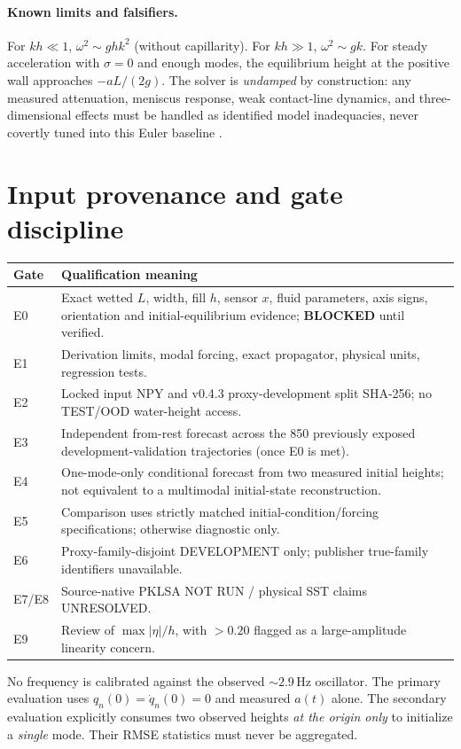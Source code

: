 \documentclass[11pt,a4paper]{article}
\begin{document}
\paragraph{Known limits and falsifiers.} For $kh\ll1$, $\omega^2\sim ghk^2$ (without capillarity). For $kh\gg1$, $\omega^2\sim gk$. For steady acceleration with $\sigma=0$ and enough modes, the equilibrium height at the positive wall approaches $-aL/(2g)$. The solver is \emph{undamped} by construction: any measured attenuation, meniscus response, weak contact-line dynamics, and three-dimensional effects must be handled as identified model inadequacies, never covertly tuned into this Euler baseline \cite{FaltinsenTimokha2009,FaltinsenEtAl2000}.

\section{Input provenance and gate discipline}
\begin{center}
\begin{tabular}{@{}lp{11.5cm}@{}}\toprule
Gate & Qualification meaning\\\midrule
E0 & Exact wetted $L$, width, fill $h$, sensor $x$, fluid parameters, axis signs, orientation and initial-equilibrium evidence; \textbf{BLOCKED} until verified.\\
E1 & Derivation limits, modal forcing, exact propagator, physical units, regression tests.\\
E2 & Locked input NPY and v0.4.3 proxy-development split SHA-256; no TEST/OOD water-height access.\\
E3 & Independent from-rest forecast across the 850 previously exposed development-validation trajectories (once E0 is met).\\
E4 & One-mode-only conditional forecast from two measured initial heights; not equivalent to a multimodal initial-state reconstruction.\\
E5 & Comparison uses strictly matched initial-condition/forcing specifications; otherwise diagnostic only.\\
E6 & Proxy-family-disjoint DEVELOPMENT only; publisher true-family identifiers unavailable.\\
E7/E8 & Source-native PKLSA NOT RUN / physical SST claims UNRESOLVED.\\
E9 & Review of $\max|\eta|/h$, with $>0.20$ flagged as a large-amplitude linearity concern.\\\bottomrule
\end{tabular}
\end{center}
\noindent No frequency is calibrated against the observed $\sim2.9\,\mathrm{Hz}$ oscillator. The primary evaluation uses $q_n(0)=\dot q_n(0)=0$ and measured $a(t)$ alone. The secondary evaluation explicitly consumes two observed heights \emph{at the origin only} to initialize a \emph{single} mode. Their RMSE statistics must never be aggregated.
\end{document}
